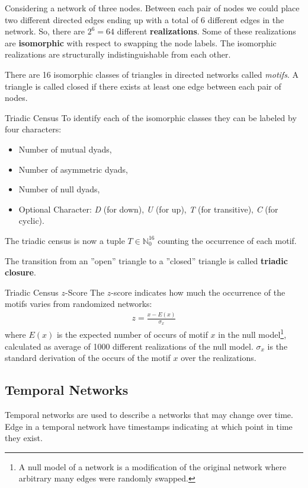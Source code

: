 \documentclass[english]{panikzettel}
\begin{document}
Considering a network of three nodes.
Between each pair of nodes we could place two different directed edges ending up with a total of 6 different edges in the network.
So, there are $ 2^6 = 64 $ different \textbf{realizations}.
Some of these realizations are \textbf{isomorphic} with respect to swapping the node labels.
The isomorphic realizations are structurally indistinguishable from each other.

There are 16 isomorphic classes of triangles in directed networks called \textit{motifs}.
A triangle is called closed if there exists at least one edge between each pair of nodes.

\begin{defi}{Triadic Census}
To identify each of the isomorphic classes they can be labeled by four characters:
\begin{itemize}
	\item Number of mutual dyads,
	\item Number of asymmetric dyads,
	\item Number of null dyads,
	\item Optional Character: \textit{D} (for down), \textit{U} (for up), \textit{T} (for transitive), \textit{C} (for cyclic).
\end{itemize}
The triadic census is now a tuple $ T \in \mathbb{N}_0^{16} $ counting the occurrence of each motif.
\end{defi}

The transition from an ''open'' triangle to a ''closed'' triangle is called \textbf{triadic closure}.

\begin{defi}{Triadic Census $ z $-Score}
The $ z $-score indicates how much the occurrence of the motifs varies from randomized networks:
\begin{align*}
	z = \frac{x - E(x)}{\sigma_x}
\end{align*}
where $ E(x) $ is the expected number of occurs of motif $ x $ in the null model\footnote{A null model of a network is a modification of the original network where arbitrary many edges were randomly swapped.}, calculated as average of 1000 different realizations of the null model.
$ \sigma_x $ is the standard derivation of the occurs of the motif $ x $ over the realizations.
\end{defi}

\subsection{Temporal Networks}
Temporal networks are used to describe a networks that may change over time.
Edge in a temporal network have timestamps indicating at which point in time they exist.
\end{document}
